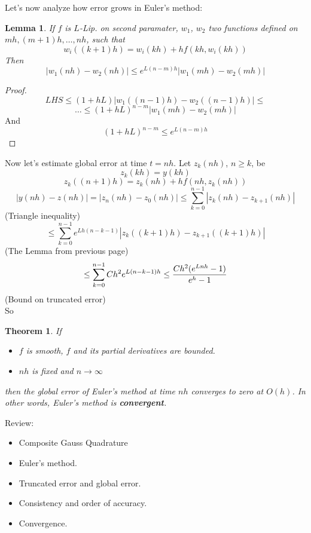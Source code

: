 \documentclass[20pt]{article} %
\theoremstyle{break}
\newtheorem{lem}[definition]{Lemma}
\newtheorem{thm}[definition]{Theorem}
\begin{document}
\newpage

Let's now analyze how error grows in Euler's method:

\begin{lem}
  If $f$ is $L$-Lip. on second paramater, $w_1$, $w_2$ two functions defined on $mh, (m+1)h, \dots, nh$, such that
  \[w_i((k+1)h)=w_i(kh)+hf(kh, w_i(kh))\]
  Then 
\[|w_1(nh)-w_2(nh)|\leq e^{L(n-m)h}|w_1(mh)-w_2(mh)|\]
\end{lem}

\begin{proof}
  \[LHS\leq (1+hL)|w_1((n-1)h)-w_2((n-1)h)|\leq\]
    \[\dots\leq (1+hL)^{n-m}|w_1(mh)-w_2(mh)|\]
 And \[(1+hL)^{n-m}\leq e^{L(n-m)h}\]
\end{proof}

\newpage

Now let's estimate global error at time $t=nh$. Let $z_k(nh)$, $n\geq k$, be
\[z_k(kh)=y(kh)\]
\[z_k((n+1)h)=z_k(nh)+hf(nh, z_k(nh))\]
\[|y(nh)-z(nh)|=|z_{n}(nh)-z_{0}(nh)|\leq \sum_{k=0}^{n-1}|z_k(nh)-z_{k+1}(nh)|\]
(Triangle inequality)
\[\leq \sum_{k=0}^{n-1}e^{Lh(n-k-1)}|z_k((k+1)h)-z_{k+1}((k+1)h)|\]
(The Lemma from previous page)
\[\leq \sum_{k=0}^{n-1}Ch^2 e^{L(n-k-1)h}\leq {Ch^2(e^{Lnh}-1)\over e^h-1}\]
(Bound on truncated error)\\
So
\begin{thm}
If
\begin{itemize}
\item $f$ is smooth, $f$ and its partial derivatives are bounded.
\item $nh$ is fixed and $n\rightarrow\infty$
\end{itemize}
then the global error of Euler's method at time $nh$ converges to zero at $O(h)$. In other words, Euler's method is {\bf convergent}.
\end{thm}

\newpage

Review:

\begin{itemize}
\item Composite Gauss Quadrature
\item Euler's method.
\item Truncated error and global error.
\item Consistency and order of accuracy.
\item Convergence.
\end{itemize}


\newpage
\end{document}
